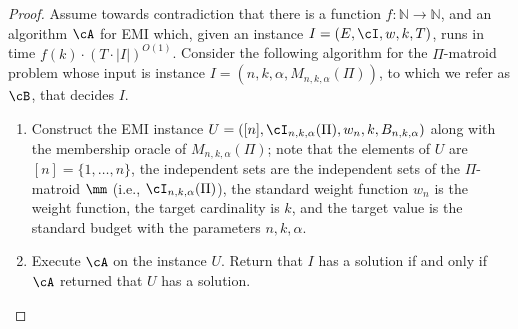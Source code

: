 \begin{proof}
	Assume towards contradiction that there is a function $f:\mathbb{N} \rightarrow \mathbb{N}$,  and an algorithm $\cA$ for  \textnormal{EMI} which, given an instance $I=(E,\cI,w,k,T)$, runs in time  $f(k) \cdot \left(T \cdot |I|\right)^{O(1)}$.  
   Consider the following algorithm for the $\Pi$-matroid problem whose input is instance $I=(n,k,\alpha,M_{n,k,\alpha}(\Pi))$, to which we refer as  $\cB$, that decides $I$.
	\begin{enumerate}
		\item Construct the EMI instance $%
		U= ([n],\cI_{n,k,\alpha}(\Pi),w_{n},k,B_{n,k,\alpha})$ along with the membership oracle of $M_{n,k,\alpha}(\Pi)$; note that the elements of $U$ are $[n] = \{1,\ldots, n \}$, the independent sets are the independent sets of the $\Pi$-matroid $\mm$ (i.e., $\cI_{n,k,\alpha}(\Pi)$), the standard weight function $w_n$ is the weight function, the target cardinality is $k$, and the target value is the standard budget with the parameters $n,k,\alpha$. %
		\item %
		Execute $\cA$ on the instance  $U$.  %
		 Return that $I$ has a solution if and only if $\cA$ returned that $U$ has a solution.  %
	\end{enumerate}
	

\end{proof}
